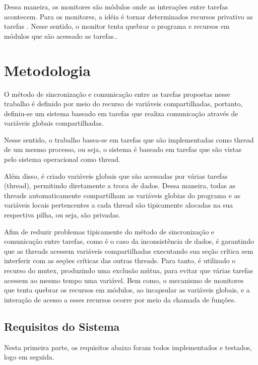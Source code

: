 \documentclass[journal]{IEEEtran}
\begin{document}
Dessa maneira, os monitores são módulos onde as interações entre tarefas acontecem. Para os monitores, a idéia é tornar determinados recursos privativo as tarefas \cite{IEEEhowto:romulo}. Nesse sentido, o monitor tenta quebrar o programa e recursos em módulos que são acessado as tarefas.. 

\section{Metodologia}

O método de sincronização e comunicação entre as tarefas propostas nesse trabalho é definido por meio do recurso de variáveis compartilhadas, portanto, definiu-se um sistema baseado em tarefas que realiza comunicação através de variáveis globais compartilhadas.

Nesse sentido, o trabalho basea-se em tarefas que são implementadas como thread de um mesmo processo, ou seja, o sistema é baseado em tarefas que são vistas pelo sistema operacional como thread.

Além disso,  é criado variáveis globais que são acessadas por várias tarefas (thread), permitindo diretamente a troca de dados. Dessa maneira, todas as threads automaticamente compartilham as variáveis globias do programa e as variáveis locais pertencentes a cada thread são tipicamente alocadas na  sua respectiva pilha, ou seja, são privadas. 

Afim de reduzir problemas tipicamente do método de sincronização e comunicação entre tarefas, como é o caso da inconsistência de dados, é garantindo que as threads acessem  variáveis compartilhadas executando sua seção crítica sem interferir com as seções críticas das outras threads. Para tanto, é utilizado o recurso do mutex, produzindo uma exclusão mútua, para evitar que várias tarefas acessem ao mesmo tempo uma variável. Bem como, o mecanismo de monitores que tenta quebrar os recursos em módulos, ao incapsular as variáveis globais, e a interação de acesso a esses recursos ocorre por meio da chamada de funções. 


\subsection{Requisitos do Sistema}

Nesta primeira parte, os requisitos abaixo foram todos implementados e testados, logo em seguida.
\end{document}
